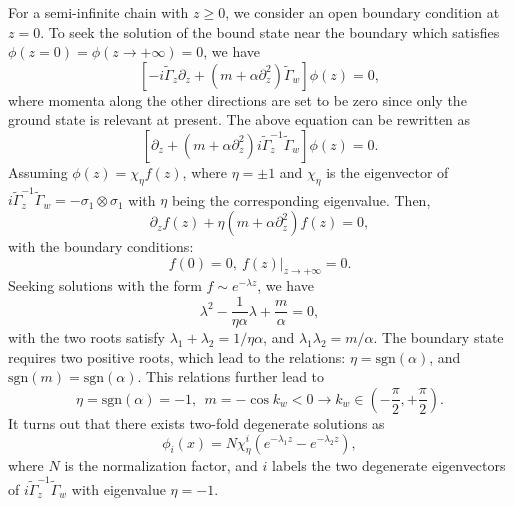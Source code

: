 \documentclass[twocolumn,prl,10pt,superscriptaddress]{revtex4}
\begin{document}
\begin{appendix}
For a semi-infinite chain with $z\geq 0$, we consider an open boundary condition
at $z=0$. To seek the solution of the bound state near the boundary which satisfies $\phi(z=0)=\phi(z\rightarrow+\infty)=0$, we have
\begin{equation}
\left[-i\tilde{\Gamma}_z\partial_z+(m+\alpha\partial_z^2)\tilde{\Gamma}_w\right]\phi(z)=0,
\end{equation}
where momenta along the other directions are set to be zero since only the ground state is relevant at present. The above equation can be rewritten as
\begin{equation}
\left[\partial_z+(m+\alpha\partial_z^2)i\tilde{\Gamma}_z^{-1}\tilde{\Gamma}_w\right]\phi(z)=0.
\end{equation}
Assuming $\phi(z)=\chi_{\eta}f(z)$, where $\eta=\pm1$ and $\chi_{\eta}$ is the eigenvector of $i\tilde{\Gamma}_z^{-1}\tilde{\Gamma}_w=-\sigma_1\otimes\sigma_1$ with $\eta$ being the corresponding eigenvalue. Then,
\begin{equation}
\partial_z f(z)+\eta(m+\alpha\partial_z^2)f(z)=0,
\end{equation}
with the boundary conditions:
\begin{equation}
f(0)=0,~f(z)|_{z\rightarrow +\infty}=0.
\end{equation}
Seeking solutions with the form $f\sim e^{-\lambda z}$, we have
\begin{equation}
\lambda^2-\frac{1}{\eta\alpha}\lambda+\frac{m}{\alpha}=0,
\end{equation}
with the two  roots satisfy $\lambda_1+\lambda_2=1/\eta\alpha$, and $\lambda_1\lambda_2=m/\alpha$. The boundary state requires two positive roots, which lead to the relations:  $\eta=\text{sgn}(\alpha)$, and $\text{sgn}(m)=\text{sgn}(\alpha)$. This relations further lead to
\begin{equation}
\eta=\text{sgn}(\alpha)=-1, ~~m=-\cos k_w<0\rightarrow k_{w}\in (-\frac{\pi}{2},+\frac{\pi}{2}).
\end{equation}
 It turns out that there exists two-fold degenerate solutions as
\begin{equation}
\phi_i(x)=N\chi^i_{\eta}(e^{-\lambda_1z}-e^{-\lambda_2z}),
\end{equation}
where $N$ is the normalization factor, and $i$ labels the two degenerate eigenvectors of $i\tilde{\Gamma}_z^{-1}\tilde{\Gamma}_w$ with eigenvalue $\eta=-1$.


\end{appendix}
\end{document}
